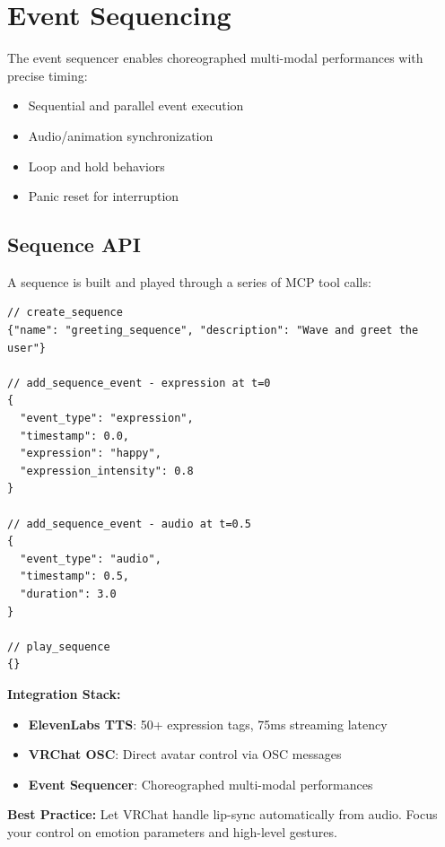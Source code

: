 \documentclass[11pt,letterpaper]{article}
\begin{document}
\section{Event Sequencing}

\begin{systembox}
The event sequencer enables choreographed multi-modal performances with precise timing:
\begin{itemize}[nosep]
  \item Sequential and parallel event execution
  \item Audio/animation synchronization
  \item Loop and hold behaviors
  \item Panic reset for interruption
\end{itemize}
\end{systembox}

\subsection{Sequence API}

A sequence is built and played through a series of MCP tool calls:

\begin{lstlisting}[language={}, caption=Creating a Sequence (MCP Tool Calls)]
// create_sequence
{"name": "greeting_sequence", "description": "Wave and greet the user"}

// add_sequence_event - expression at t=0
{
  "event_type": "expression",
  "timestamp": 0.0,
  "expression": "happy",
  "expression_intensity": 0.8
}

// add_sequence_event - audio at t=0.5
{
  "event_type": "audio",
  "timestamp": 0.5,
  "duration": 3.0
}

// play_sequence
{}
\end{lstlisting}

\begin{tcolorbox}[
  enhanced,
  colback=vcprimary!5,
  colframe=vcprimary!50,
  boxrule=1pt,
  arc=6pt,
  left=12pt, right=12pt, top=10pt, bottom=10pt,
  title={\textcolor{white}{\sffamily\bfseries Part IV Summary: Audio \& Gestures}},
  colbacktitle=vcprimary,
  partsummary
]
\small
\textbf{Integration Stack:}
\begin{itemize}[nosep, leftmargin=1.2em]
  \item \textbf{ElevenLabs TTS}: 50+ expression tags, 75ms streaming latency
  \item \textbf{VRChat OSC}: Direct avatar control via OSC messages
  \item \textbf{Event Sequencer}: Choreographed multi-modal performances
\end{itemize}

\vspace{0.5em}
\textcolor{coolgray}{\small\textbf{Best Practice:} Let VRChat handle lip-sync automatically from audio. Focus your control on emotion parameters and high-level gestures.}
\end{tcolorbox}
\end{document}
